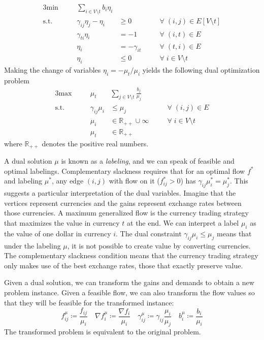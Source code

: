 \documentclass[11pt]{article}
\theoremstyle{definition}
\theoremstyle{definition}
\newcommand{\R}{\mathbb{R}}
\newcommand{\gij}{\gamma_{ij}}
\begin{document}
	\begin{alignat*}{3}\tag{P}
    \text{min} &\quad &\sum_{i \in V \setminus t} b_i \eta_i \\
    \text{s.t.}
    &   &\gij \eta_j - \eta_i &\geq 0 \quad &&\forall\; (i, j) \in E[V \setminus t] \\
    &   &\gamma_{ti} \eta_i &= -1 \quad     &&\forall\; (i, t) \in E \\
    &   &\eta_i &= -\gamma_{it} \quad       &&\forall\; (t, i) \in E \\
    &   &\eta_i &\leq 0 \quad               &&\forall\; i \in V \setminus t
    \end{alignat*}
	Making the change of variables $\eta_i = - \mu_t / \mu_i$ yields the following
	dual optimization problem
    \begin{alignat*}{3}\tag{D}
    \text{max} &\quad &\mu_t &\sum_{j \in V \setminus t} \frac{b_j}{\mu_j}  \\
    \text{s.t.}
    &   &\gij \mu_i &\leq \mu_j \quad &&\forall\; (i, j) \in E \\
    &   &\mu_i &\in \R_{++} \cup \infty \quad &&\forall\; i \in V \setminus t \\
    &   &\mu_t &\in \R_{++}
    \end{alignat*}
    where $\R_{++}$ denotes the positive real numbers.
        
	A dual solution $\mu$ is known as a \emph{labeling}, and we can speak of feasible and
	optimal labelings. Complementary
	slackness requires that for an optimal flow $f^*$ and labeling $\mu^*$,
	any edge $(i, j)$ with flow on it ($f^*_{ij} > 0$) has $\gamma_{ij}\mu^*_i = \mu^*_j$.
	This suggests a particular interpretation of the dual variables. Imagine that
	the vertices represent currencies and the gains represent exchange rates between those currencies.
	A maximum generalized flow is the currency trading strategy that maximizes the value in currency
	$t$ at the end. We can interpret a label $\mu_i$ as the value of one dollar in currency $i$.
	The dual constraint $\gamma_{ij} \mu_i \leq \mu_j$ means that under the labeling $\mu$,
	it is not possible to create value by converting currencies.
	The complementary slackness condition means that the currency trading strategy
	only makes use of the best exchange rates, those that exactly preserve value.
	
	Given a dual solution, we can transform the gains and demands to obtain a new
	problem instance. Given a feasible flow, we can also transform the flow values
	so that they will be feasible for the transformed instance:
	\[ f_{ij}^\mu \coloneqq \frac{f_{ij}}{\mu_i} \quad
	\nabla f_i^\mu \coloneqq \frac{\nabla f_i }{\mu_i} \quad
	\gamma_{ij}^\mu \coloneqq \gamma_{ij} \frac{\mu_i}{\mu_j} \quad
	b_i^\mu \coloneqq \frac{b_i}{\mu_i} \]
	The transformed problem is equivalent to the original problem.
	
\end{document}
